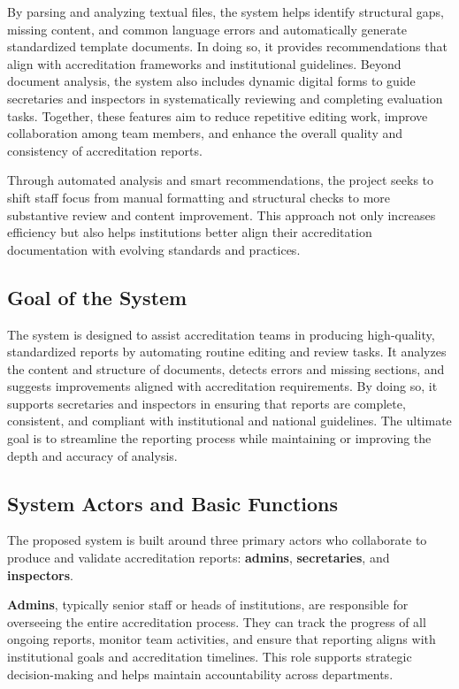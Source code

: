 By parsing and analyzing textual files, the system helps identify structural gaps, missing content, and common language errors and automatically generate standardized template documents. In doing so, it provides recommendations that align with accreditation frameworks and institutional guidelines. Beyond document analysis, the system also includes dynamic digital forms to guide secretaries and inspectors in systematically reviewing and completing evaluation tasks. Together, these features aim to reduce repetitive editing work, improve collaboration among team members, and enhance the overall quality and consistency of accreditation reports.

Through automated analysis and smart recommendations, the project seeks to shift staff focus from manual formatting and structural checks to more substantive review and content improvement. This approach not only increases efficiency but also helps institutions better align their accreditation documentation with evolving standards and practices.

\subsection{Goal of the System}
The system is designed to assist accreditation teams in producing high-quality, standardized reports by automating routine editing and review tasks. It analyzes the content and structure of documents, detects errors and missing sections, and suggests improvements aligned with accreditation requirements. By doing so, it supports secretaries and inspectors in ensuring that reports are complete, consistent, and compliant with institutional and national guidelines. The ultimate goal is to streamline the reporting process while maintaining or improving the depth and accuracy of analysis.

\subsection{System Actors and Basic Functions}

The proposed system is built around three primary actors who collaborate to produce and validate accreditation reports: \textbf{admins}, \textbf{secretaries}, and \textbf{inspectors}.

\textbf{Admins}, typically senior staff or heads of institutions, are responsible for overseeing the entire accreditation process. They can track the progress of all ongoing reports, monitor team activities, and ensure that reporting aligns with institutional goals and accreditation timelines. This role supports strategic decision-making and helps maintain accountability across departments.

